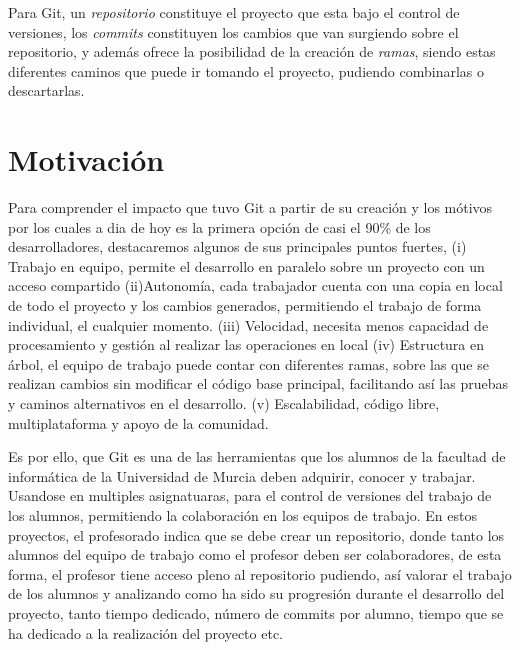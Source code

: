 Para Git, un \textit{repositorio} constituye el proyecto que esta bajo el control de versiones, los \textit{commits} constituyen los cambios que van surgiendo sobre el repositorio, y además ofrece la posibilidad de la creación de \textit{ramas}, siendo estas diferentes caminos que puede ir tomando el proyecto, pudiendo combinarlas o descartarlas.



\section{Motivación\label{01intro_motivacion}}

Para comprender el impacto que tuvo Git a partir de su creación y los mótivos por los cuales a dia de hoy es la primera opción de casi el 90\% de los desarrolladores, destacaremos algunos de sus principales puntos fuertes, (i) Trabajo en equipo, permite el desarrollo en paralelo sobre un proyecto con un acceso compartido (ii)Autonomía, cada trabajador cuenta con una copia en local de todo el proyecto y los cambios generados, permitiendo el trabajo de forma individual, el cualquier momento. (iii) Velocidad, necesita menos capacidad de procesamiento y gestión al realizar las operaciones en local (iv) Estructura en árbol, el equipo de trabajo puede contar con diferentes ramas, sobre las que se realizan cambios sin modificar el código base principal, facilitando así las pruebas y caminos alternativos en el desarrollo. (v) Escalabilidad, código libre, multiplataforma y apoyo de la comunidad.

Es por ello, que Git es una de las herramientas que los alumnos de la facultad de informática de la Universidad de Murcia deben adquirir, conocer y trabajar. Usandose en multiples asignatuaras, para el control de versiones del trabajo de los alumnos, permitiendo la colaboración en los equipos de trabajo. En estos proyectos, el profesorado indica que se debe crear un repositorio, donde tanto los alumnos del equipo de trabajo como el profesor deben ser colaboradores, de esta forma, el profesor tiene acceso pleno al repositorio pudiendo, así valorar el trabajo de los alumnos y analizando como ha sido su progresión durante el desarrollo del proyecto, tanto tiempo dedicado, número de commits por alumno, tiempo que se ha dedicado a la realización del proyecto etc.

